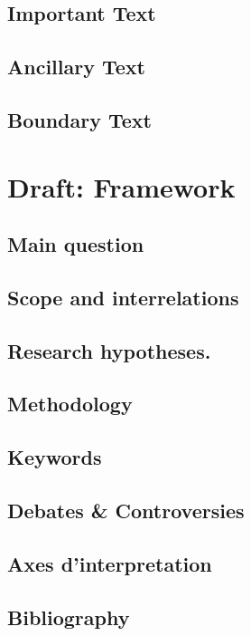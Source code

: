 \documentclass[paper=B6,portrait,twoside=true,twocolumn=false,headinclude=true,footinclude=false,fontsize=12,BCOR=10mm,DIV=calc,pagesize=auto,titlepage=firstiscover,mpinclude=false,headings=normal,headings=twolinechapter,open=right,toc=graduated,chapterprefix=false,numbers=endperiod,parskip=half+]{scrbook}
\theoremstyle{definition}
\begin{document}
\section{Important Text}
\label{sec:org90db3cc}
\lipsum
\section{Ancillary Text}
\label{sec:orgdd2c2e5}
\lipsum
\section{Boundary Text}
\label{sec:org6e9e93d}
\lipsum
\chapter{Draft: Framework}
\label{sec:org9c0c74c}
\section{Main question}
\label{sec:orgc7e306b}
\lipsum
\section{Scope and interrelations}
\label{sec:orge6a3f33}
\lipsum
\section{Research hypotheses.}
\label{sec:org6353d6e}
\lipsum
\section{Methodology}
\label{sec:org259ddda}
\lipsum
\section{Keywords}
\label{sec:orgfc681d3}
\lipsum
\section{Debates \& Controversies}
\label{sec:orgbad6469}
\lipsum
\section{Axes d'interpretation}
\label{sec:org5659612}
\lipsum
\section{Bibliography}
\label{sec:org20b2ca2}
\end{document}
